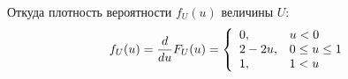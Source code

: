 \begin{enumerate}
    Откуда плотность вероятности $f_U(u)$ величины $U$:
    \begin{equation}
        f_U(u)
        = \frac{d}{du} F_U(u)
        = \left \{
        \begin{array}{ll}
            0,      & u < 0         \\
            2 - 2u, & 0 \le u \le 1 \\
            1,      & 1 < u
        \end{array}
        \right .
    \end{equation}

%
\end{enumerate}

